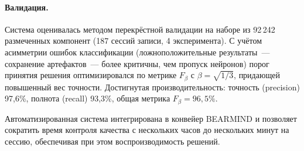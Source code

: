 \paragraph{Валидация.}
Система оценивалась методом перекрёстной валидации на наборе из 92\,242 размеченных компонент (187 сессий записи, 4 эксперимента). С учётом асимметрии ошибок классификации (ложноположительные результаты~--- сохранение артефактов~--- более критичны, чем пропуск нейронов) порог принятия решения оптимизировался по метрике $F_\beta$ с $\beta = \sqrt{1/3}$, придающей повышенный вес точности. Достигнутая производительность: точность (precision) 97{,}6\%, полнота (recall) 93{,}3\%, общая метрика $F_\beta = 96{,}5\%$.

Автоматизированная система интегрирована в конвейер BEARMIND и позволяет сократить время контроля качества с нескольких часов до нескольких минут на сессию, обеспечивая при этом воспроизводимость решений.
